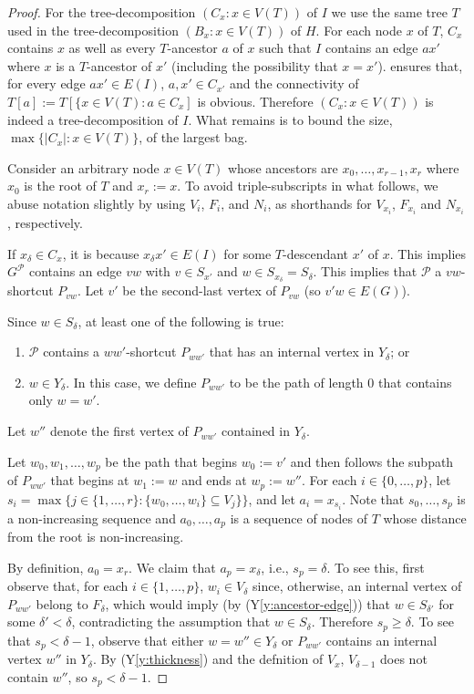 \documentclass{patmorin}
\newcommand{\yref}[1]{(Y\ref{y:#1})}
\renewcommand{\ge}{\geqslant}
\begin{document}
\begin{proof}
  For the tree-decomposition $(C_x:x\in V(T))$ of $I$ we use the same tree $T$ used in the tree-decomposition $(B_x:x\in V(T))$ of $H$. For each node $x$ of $T$, $C_x$ contains $x$ as well as every $T$-ancestor $a$ of $x$ such that $I$ contains an edge $ax'$ where $x$ is a $T$-ancestor of $x'$ (including the possibility that $x=x'$).
   ensures that, for every edge $ax'\in E(I)$, $a,x'\in C_{x'}$ and the connectivity of $T[a]:=T[\{x\in V(T):a\in C_x]$ is obvious.  Therefore $(C_x:x\in V(T))$ is indeed a tree-decomposition of $I$.  What remains is to bound the size, $\max\{|C_x|:x\in V(T)\}$, of the largest bag.
  
  Consider an arbitrary node $x\in V(T)$ whose ancestors are $x_0,\ldots,x_{r-1},x_r$ where $x_0$ is the root of $T$ and $x_r:=x$.  To avoid triple-subscripts in what follows, we abuse notation slightly by using $V_i$, $F_i$, and $N_i$,  as shorthands for $V_{x_i}$, $F_{x_i}$ and $N_{x_i}$, respectively.   

  If $x_\delta\in C_x$, it is because $x_\delta x'\in E(I)$ for some $T$-descendant $x'$ of $x$.  This implies $G^{\mathcal{P}}$ contains an edge $vw$ with $v\in S_{x'}$ and $w\in S_{x_\delta}=S_\delta$.  This implies that $\mathcal{P}$ a $vw$-shortcut $P_{vw}$.  Let $v'$ be the second-last vertex of $P_{vw}$ (so $v'w\in E(G)$).  
  
  Since $w\in S_{\delta}$, at least one of the following is true:
  \begin{enumerate}
    \item $\mathcal{P}$ contains a $ww'$-shortcut $P_{ww'}$ that has an internal vertex in $Y_{\delta}$; or
    \item $w\in Y_\delta$.  In this case, we define $P_{ww'}$ to be the path of length 0 that contains only $w=w'$. 
  \end{enumerate}
  Let $w''$ denote the first vertex of $P_{ww'}$ contained in $Y_{\delta}$.
  
  Let $w_0,w_1,\ldots,w_p$ be the path that begins $w_0:=v'$ and then follows the subpath of $P_{ww'}$ that begins at $w_1:=w$ and ends at $w_p:=w''$.  For each $i\in\{0,\ldots,p\}$, let $s_i=\max\{j\in\{1,\ldots,r\}: \{w_0,\ldots,w_i\}\subseteq V_{j}\}\}$, and let $a_i=x_{s_i}$.  Note that $s_0,\ldots,s_p$ is a non-increasing sequence and $a_0,\ldots,a_p$ is a sequence of nodes of $T$ whose distance from the root is non-increasing.

  By definition, $a_0=x_r$.  We claim that $a_p=x_\delta$, i.e., $s_p=\delta$. 
  To see this, first observe that, for each $i\in\{1,\ldots,p\}$, $w_i\in V_{\delta}$ since, otherwise, an internal vertex of $P_{ww'}$ belong to $F_\delta$, which would imply (by \yref{ancestor-edge}) that $w\in S_{\delta'}$ for some $\delta' < \delta$, contradicting the assumption that $w\in S_\delta$.  Therefore $s_p\ge\delta$.  To see that $s_p<\delta-1$,
  observe that either $w=w''\in Y_\delta$ or $P_{ww'}$ contains an internal vertex $w''$ in $Y_\delta$.  By \yref{thickness} and the defnition of $V_x$, $V_{\delta-1}$ does not contain $w''$, so $s_p<\delta-1$.
  

\end{proof}
\end{document}
